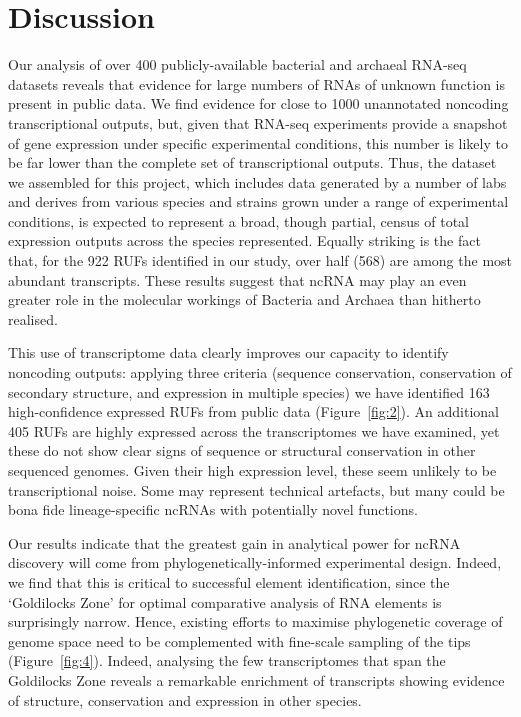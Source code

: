 \documentclass[10pt]{article}
\begin{document}
\section*{Discussion}

Our analysis of over 400 publicly-available bacterial and archaeal
RNA-seq datasets reveals that evidence for large numbers of RNAs of
unknown function is present in public data. We find evidence for close
to 1000 unannotated noncoding transcriptional outputs, but, given that
RNA-seq experiments provide a snapshot of gene expression under
specific experimental conditions, this number is likely to be far
lower than the complete set of transcriptional outputs. Thus, the
dataset we assembled for this project, which includes data generated
by a number of labs and derives from various species and strains grown
under a range of experimental conditions, is expected to represent a
broad, though partial, census of total expression outputs across the
species represented. Equally striking is the fact that, for the 922
RUFs identified in our study, over half (568) are among the most
abundant transcripts. These results suggest that ncRNA may play an
even greater role in the molecular workings of Bacteria and Archaea
than hitherto realised.

This use of transcriptome data clearly improves our capacity to
identify noncoding outputs: applying three criteria (sequence
conservation, conservation of secondary structure, and expression in
multiple species) we have identified 163 high-confidence expressed
RUFs from public data (Figure~\ref{fig:2}). An additional 405 RUFs are highly
expressed across the transcriptomes we have examined, yet these do not
show clear signs of sequence or structural conservation in other
sequenced genomes. Given their high expression level, these seem
unlikely to be transcriptional noise. Some may represent technical
artefacts, but many could be bona fide lineage-specific ncRNAs with
potentially novel functions.

Our results indicate that the greatest gain in analytical power for
ncRNA discovery will come from phylogenetically-informed experimental
design. Indeed, we find that this is critical to successful element
identification, since the ‘Goldilocks Zone’ for optimal comparative
analysis of RNA elements is surprisingly narrow. Hence, existing
efforts to maximise phylogenetic coverage of genome space
\cite{Wu:2009,Rinke:2013} need to be complemented with fine-scale
sampling of the tips (Figure~\ref{fig:4}). Indeed, analysing the few
transcriptomes that span the Goldilocks Zone reveals a remarkable
enrichment of transcripts showing evidence of structure, conservation
and expression in other species.
\end{document}
